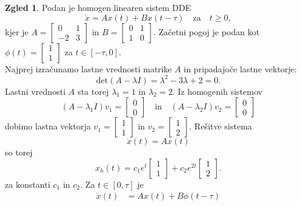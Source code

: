 \documentclass[12pt,a4paper]{amsart}
\theoremstyle{definition} %
\newtheorem{zgled}[definicija]{Zgled}
\theoremstyle{plain} %
\begin{document}
\begin{zgled}
    Podan je homogen linearen sistem DDE
    \[\dot{x}=Ax(t)+Bx(t-\tau)\quad \text{za}\quad t\geq0,\]
    kjer je $A=
    \begin{bmatrix}
        0 & 1 \\
        -2 & 3 
    \end{bmatrix}$
    in $B=
    \begin{bmatrix}
        0 & 1 \\
        1 & 0 
    \end{bmatrix}.$
    Začetni pogoj je podan kot 
    $\phi(t)=\begin{bmatrix}
        1 \\
        1 
    \end{bmatrix}$
    za $t\in[-\tau,0]$. \\
    Najprej izračunamo lastne vrednosti matrike $A$ in pripadajoče lastne vektorje:
    \[\text{det}(A-\lambda I)=\lambda^2-3\lambda+2=0.\]
    Lastni vrednosti $A$ sta torej $\lambda_1=1$ in $\lambda_2=2$.
    Iz homogenih sistemov
    \[(A-\lambda_1 I)v_1=\begin{bmatrix}
        0 \\
        0 
    \end{bmatrix}
    \quad \text{in} \quad
    (A-\lambda_2 I)v_2=\begin{bmatrix}
        0 \\
        0 
    \end{bmatrix}\]
    dobimo lastna vektorja $v_1=\begin{bmatrix}
        1 \\
        1 
    \end{bmatrix}$
    in  $v_2=\begin{bmatrix}
        1 \\
        2 
    \end{bmatrix}$.
    Rešitve sistema 
    \[\dot{x}(t)=Ax(t)\]
    so torej 
    \[x_h(t)=c_1e^t\begin{bmatrix}
        1 \\
        1 
    \end{bmatrix}
    +c_2e^{2t}\begin{bmatrix}
        1 \\
        2 
    \end{bmatrix}.\]
    za konstanti $c_1$ in $c_2$. 
    Za $t\in[0,\tau]$ je
    \begin{equation*}
        \begin{split}
            \dot{x}(t) &= Ax(t)+B\phi(t-\tau) \\

\end{split}
\end{equation*}
\end{zgled}
\end{document}
